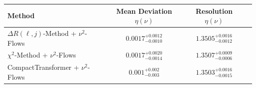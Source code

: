     \begin{tabular}{lccc}
        \toprule
        Method & Mean Deviation $\eta({\nu})$ & Resolution $\eta({\nu})$ \\
        \midrule
        $\Delta R(\ell,j)$-Method + $\nu^2$-Flows & $0.0017^{+0.0012}_{-0.0010}$ & $1.3505^{+0.0016}_{-0.0012}$ \\
        $\chi^2$-Method + $\nu^2$-Flows & $0.0017^{+0.0020}_{-0.0014}$ & $1.3507^{+0.0009}_{-0.0006}$ \\
        CompactTransformer + $\nu^2$-Flows & $0.001^{+0.002}_{-0.003}$ & $1.3503^{+0.0016}_{-0.0015}$ \\
        \bottomrule
    \end{tabular}